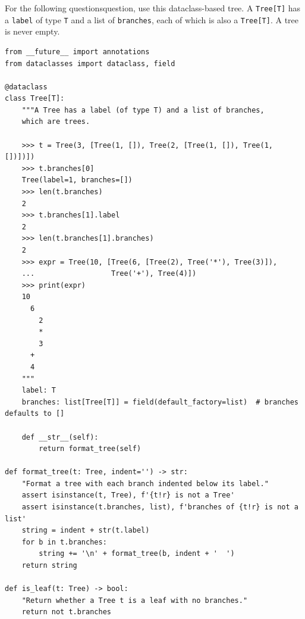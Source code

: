 For the following \ifdefined\treemultiplequestions questions\else question\fi, use this dataclass-based tree. A
\lstinline{Tree[T]} has a \lstinline{label} of type \lstinline{T} and a list of
\lstinline{branches}, each of which is also a \lstinline{Tree[T]}.
A tree is never empty.

\begin{lstlisting}
from __future__ import annotations
from dataclasses import dataclass, field

@dataclass
class Tree[T]:
    """A Tree has a label (of type T) and a list of branches,
    which are trees.

    >>> t = Tree(3, [Tree(1, []), Tree(2, [Tree(1, []), Tree(1, [])])])
    >>> t.branches[0]
    Tree(label=1, branches=[])
    >>> len(t.branches)
    2
    >>> t.branches[1].label
    2
    >>> len(t.branches[1].branches)
    2
    >>> expr = Tree(10, [Tree(6, [Tree(2), Tree('*'), Tree(3)]),
    ...                  Tree('+'), Tree(4)])
    >>> print(expr)
    10
      6
        2
        *
        3
      +
      4
    """
    label: T
    branches: list[Tree[T]] = field(default_factory=list)  # branches defaults to []

    def __str__(self):
        return format_tree(self)

def format_tree(t: Tree, indent='') -> str:
    "Format a tree with each branch indented below its label."
    assert isinstance(t, Tree), f'{t!r} is not a Tree'
    assert isinstance(t.branches, list), f'branches of {t!r} is not a list'
    string = indent + str(t.label)
    for b in t.branches:
        string += '\n' + format_tree(b, indent + '  ')
    return string

def is_leaf(t: Tree) -> bool:
    "Return whether a Tree t is a leaf with no branches."
    return not t.branches
\end{lstlisting}
